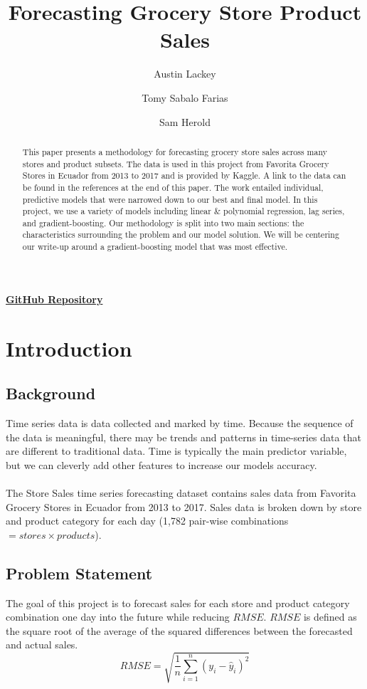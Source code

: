 \documentclass[12pt]{article}
\title{Forecasting Grocery Store Product Sales}
\author{Austin Lackey}
\author{Tomy Sabalo Farias}
\author{Sam Herold}
\affil{DSCI 478, Colorado State University}
\begin{document}
\maketitle
\begin{center}
    \href{https://github.com/austinlackey/store-sales-forecasting}{\textbf{GitHub Repository}}
\end{center}

\begin{abstract}
This paper presents a methodology for forecasting grocery store sales across many stores and product subsets.
The data is used in this project from Favorita Grocery Stores in Ecuador from 2013 to 2017 and is provided by Kaggle.
A link to the data can be found in the references at the end of this paper. The work entailed individual, predictive models that were narrowed down to our best and final model.
In this project, we use a variety of models including linear \& polynomial regression, lag series, and gradient-boosting. 
Our methodology is split into two main sections: the characteristics surrounding the problem and our model solution. We will be centering our write-up around a gradient-boosting model that was most effective.
\end{abstract}

\section{Introduction}
\subsection{Background}
Time series data is data collected and marked by time. 
Because the sequence of the data is meaningful, there may be trends and patterns in time-series data that are different to traditional data.
Time is typically the main predictor variable, but we can cleverly add other features to increase our models accuracy\cite{timeseries}.
\\
\\
The Store Sales time series forecasting dataset contains sales data from Favorita Grocery Stores in Ecuador from 2013 to 2017\cite{kaggle}.
Sales data is broken down by store and product category for each day (1,782 pair-wise combinations $=stores \times products$).
\subsection{Problem Statement}
The goal of this project is to forecast sales for each store and product category combination one day into the future while reducing $RMSE$.
$RMSE$ is defined as the square root of the average of the squared differences between the forecasted and actual sales.
\[ RMSE = \sqrt{\frac{1}{n}\sum_{i=1}^{n}(y_i - \hat{y}_i)^2} \]
\end{document}
